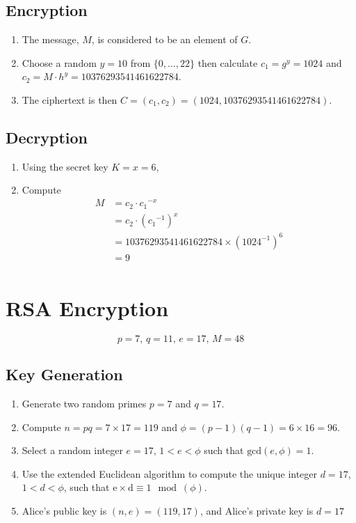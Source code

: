 \documentclass[11pt]{article} %
\begin{document}
\subsection{Encryption}
\begin{enumerate}
	\item The message, $M$, is considered to be an element of $G$.
	\item Choose a random $y=10$ from $\{0,\ldots, 22\}$ then calculate $c_1 =
		g^y = 1024$ and $c_2 = M \cdot h^y = 10376293541461622784$.
	\item The ciphertext is then $C = (c_1, c_2) = (1024, 10376293541461622784)$.
\end{enumerate}

\subsection{Decryption}
\begin{enumerate}
	\item Using the secret key $K=x=6$,
	\item Compute
		\begin{align*}
			M &= c_2 \cdot c{_1}^{-x} \\
			  &= c_2 \cdot {(c{_1}^{-1})}^x \\
			  &= 10376293541461622784 \times {(1024^{-1})}^6 \\
			  &= 9 \\
		\end{align*}
\end{enumerate}

\section{RSA Encryption}
\begin{equation}
	p=7,\, q=11,\, e=17,\, M=48
\end{equation}
\subsection{Key Generation}
\begin{enumerate}
	\item Generate two random primes $p=7$ and $q=17$.
	\item Compute $n=pq = 7 \times 17 = 119$ and $\phi = (p-1)(q-1) = 6 \times
		16 = 96$.
	\item Select a random integer $e=17$, $1<e<\phi$ such that
		$\text{gcd}(e,\phi) = 1$.
	\item Use the extended Euclidean algorithm to compute the unique integer
		$d=17$, $1<d<\phi$, such that $\text{e}\times\text{d} \equiv 1 \mod
		(\phi)$.
	\item Alice's public key is $(n,e) = (119, 17)$, and Alice's private key is $d=17$
\end{enumerate}
\end{document}
